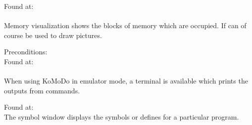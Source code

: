 \graphicspath{ {images/extra/} }
Found at: \\\\
Memory visualization shows the blocks of memory which are occupied. If can of course be used to draw pictures.

Preconditions: \\
Found at: \\\\
When using KoMoDo in emulator mode, a terminal is available which prints the outputs from  commands.

Found at: \\
The symbol window displays the symbols or defines for a particular program.
